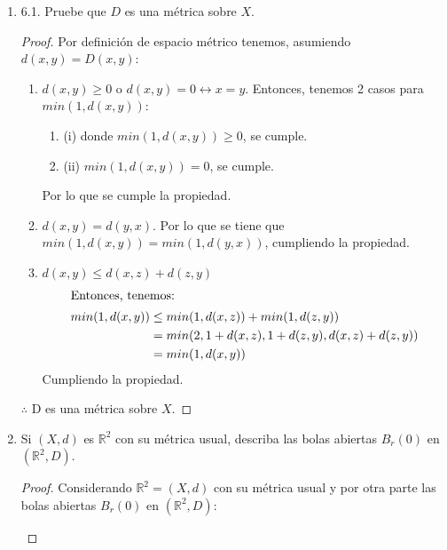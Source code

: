 \documentclass[a4paper,12pt]{article}
\begin{document}
\begin{enumerate}
    
\item 6.1. Pruebe que $D$ es una métrica sobre $X$.
\begin{proof}
Por definición de espacio métrico tenemos, asumiendo $d(x,y)=D(x,y)$: 
\begin{enumerate}
    \item $d(x,y)\geq 0$ o $d(x,y)=0\leftrightarrow x=y$. Entonces, tenemos 2 casos para $min(1,d(x,y))$:
    \begin{enumerate}
        \item (i) donde $min(1,d(x,y))\geq0$, se cumple.
        \item (ii) $min(1,d(x,y))=0$, se cumple.
    \end{enumerate}
    Por lo que se cumple la propiedad.
    \item $d(x,y)=d(y,x)$. Por lo que se tiene que $min(1,d(x,y))=min(1,d(y,x))$, cumpliendo la propiedad. 
    \item $d(x,y)\leq d(x,z)+d(z,y)$
    \begin{align}
    \intertext{Entonces, tenemos:}
    min(1,d(x,y))&\leq min(1,d(x,z))+min(1,d(z,y))\\
                 &= min(2,1+d(x,z),1+d(z,y),d(x,z)+d(z,y))\\
                 &= min(1, d(x,y))
\end{align} Cumpliendo la propiedad.
\end{enumerate}
$\therefore$ D es una métrica sobre $X$.
\end{proof}


\item  Si $(X, d)$ es $\mathbb{R}^{2}$ con su métrica usual, describa las bolas abiertas $B_{r}(0)$ en $\left(\mathbb{R}^{2}, D\right)$.
\begin{proof}
Considerando $\mathbb{R}^2=(X,d)$ con su métrica usual y por otra parte las bolas abiertas $B_r(0)$ en $(\mathbb{R}^2,D)$: 
\begin{center}
    


\begin{tikzpicture}[x=0.75pt,y=0.75pt,yscale=-1,xscale=1]


\end{tikzpicture}
\end{center}
\end{proof}
\end{enumerate}
\end{document}
